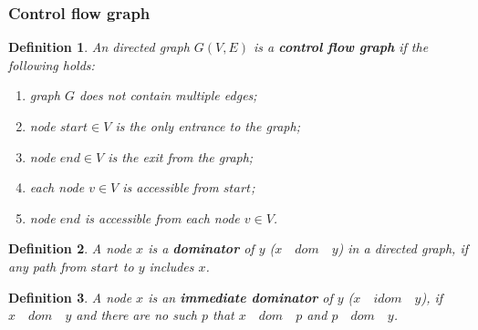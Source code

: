 \documentclass{beamer}
\begin{document}
\begin{frame}
\frametitle{Control flow graph}

\newtheorem{Def}{Definition}[section]
\begin{Def}
An directed graph $G(V,E)$ is a \textbf{control flow graph} if the following holds:
\begin{enumerate}
\item graph $G$ does not contain multiple edges;
\item node $start\in V$ is the only entrance to the graph;
\item node $end \in V$ is the exit from the graph;
\item each node $v \in V$ is accessible from $start$;
\item node $end$ is accessible from each node $v \in V$.
\end{enumerate}
\end{Def}

\newtheorem{DOM}{Definition}[section]
\begin{Def}
A node $x$ is a \textbf{dominator} of $y$ ($x\quad dom\quad y$) in a directed graph, if any path from $start$ to $y$ includes $x$.
\end{Def}

\newtheorem{IDOM}{Definition}[section]
\begin{Def}
A node $x$ is an \textbf{immediate dominator} of $y$ ($x\quad idom\quad y$), if $x\quad dom\quad y$ and there are no such $p$ that $x\quad dom\quad p$ and $p\quad dom\quad y$.
\end{Def}


\end{frame}

\end{document}
